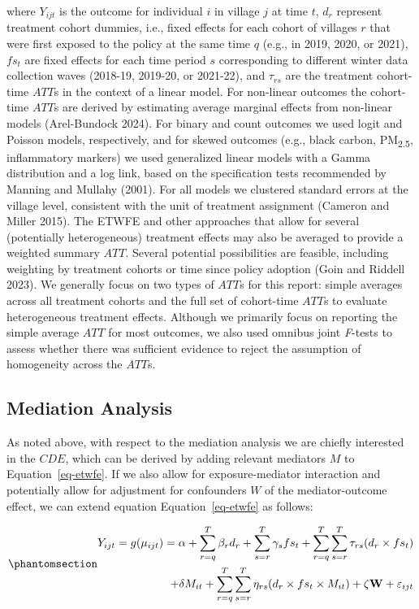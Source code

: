 \documentclass[
  letterpaper,
  DIV=11,
  numbers=noendperiod]{scrartcl}
\begin{document}
where \(Y_{ijt}\) is the outcome for individual \(i\) in village \(j\)
at time \(t\), \(d_{r}\) represent treatment cohort dummies, i.e., fixed
effects for each cohort of villages \(r\) that were first exposed to the
policy at the same time \(q\) (e.g., in 2019, 2020, or 2021), \(fs_{t}\)
are fixed effects for each time period \(s\) corresponding to different
winter data collection waves (2018-19, 2019-20, or 2021-22), and
\(\tau_{rs}\) are the treatment cohort-time \(ATT\)s in the context of a
linear model. For non-linear outcomes the cohort-time \(ATT\)s are
derived by estimating average marginal effects from non-linear models
(Arel-Bundock 2024). For binary and count outcomes we used logit and
Poisson models, respectively, and for skewed outcomes (e.g., black
carbon, PM\textsubscript{2.5}, inflammatory markers) we used generalized
linear models with a Gamma distribution and a log link, based on the
specification tests recommended by Manning and Mullahy (2001). For all
models we clustered standard errors at the village level, consistent
with the unit of treatment assignment (Cameron and Miller 2015). The
ETWFE and other approaches that allow for several (potentially
heterogeneous) treatment effects may also be averaged to provide a
weighted summary \(ATT\). Several potential possibilities are feasible,
including weighting by treatment cohorts or time since policy adoption
(Goin and Riddell 2023). We generally focus on two types of \(ATT\)s for
this report: simple averages across all treatment cohorts and the full
set of cohort-time \(ATT\)s to evaluate heterogeneous treatment effects.
Although we primarily focus on reporting the simple average \(ATT\) for
most outcomes, we also used omnibus joint \emph{F}-tests to assess
whether there was sufficient evidence to reject the assumption of
homogeneity across the \(ATT\)s.

\subsection{Mediation Analysis}\label{mediation-analysis}

As noted above, with respect to the mediation analysis we are chiefly
interested in the \(CDE\), which can be derived by adding relevant
mediators \(M\) to Equation~\ref{eq-etwfe}. If we also allow for
exposure-mediator interaction and potentially allow for adjustment for
confounders \(W\) of the mediator-outcome effect, we can extend equation
Equation~\ref{eq-etwfe} as follows:

\begin{equation}\phantomsection\label{eq-etwfem}{
\begin{aligned}
Y_{ijt}=g(\mu_{ijt}) = \alpha + \sum_{r=q}^{T} \beta_{r} d_{r} + \sum_{s=r}^{T} \gamma_{s} fs_{t}+ \sum_{r=q}^{T} \sum_{s=r}^{T} \tau_{rs} (d_{r} \times fs_{t}) \\ + \delta M_{it} + \sum_{r=q}^{T} \sum_{s=r}^{T} \eta_{rs} (d_{r} \times fs_{t} \times M_{it}) + \zeta \mathbf{W} + \varepsilon_{ijt}
\end{aligned}
}\end{equation}
\end{document}
